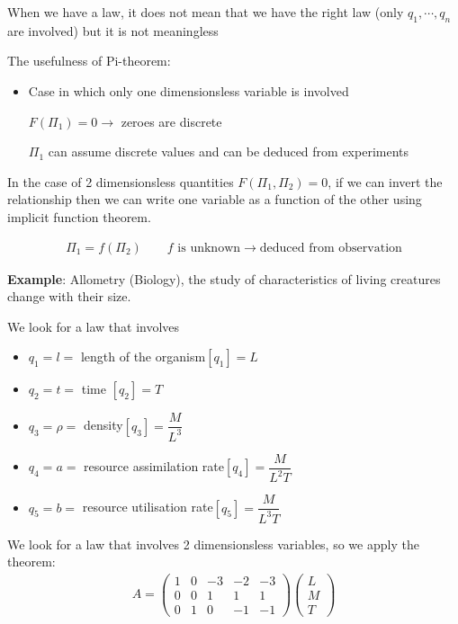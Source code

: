 \noindent When we have a law, it does not mean that we have the right law (only $q_1,\cdots,q_n$ are involved) but it is not meaningless
\par\bigskip
\noindent The usefulness of Pi-theorem:\par
\begin{itemize}
  \item Case in which only one dimensionsless variable is involved\par
    $F(\Pi_1) = 0\rightarrow$ zeroes are discrete\par
    $\Pi_1$ can assume discrete values and can be deduced from experiments
\end{itemize}
\par\bigskip
\noindent In the case of 2 dimensionsless quantities $F(\Pi_1,\Pi_2) = 0$, if we can invert the relationship then we can write one variable as a function of the other using implicit function theorem.
\par\bigskip
\begin{equation*}
  \begin{gathered}
    \Pi_1 = f(\Pi_2)\qquad\text{$f$ is unknown}\rightarrow\text{deduced from observation}
  \end{gathered}
\end{equation*}
\par\bigskip
\noindent\textbf{Example}: Allometry (Biology), the study of characteristics of living creatures change with their size. \par
\noindent We look for a law that involves\par
\begin{itemize}
  \item $q_1 = l = $ length of the organism\qquad $[q_1] = L$
  \item $q_2 = t = $ time \qquad $[q_2] = T$
  \item $q_3 = \rho = $ density\qquad $[q_3] = \dfrac{M}{L^3}$
  \item $q_4 = a = $ resource assimilation rate\qquad$[q_4] = \dfrac{M}{L^2T}$
  \item $q_5 = b = $ resource utilisation rate\qquad $[q_5] = \dfrac{M}{L^3T}$
\end{itemize}
\par\bigskip
\noindent We look for a law that involves 2 dimensionsless variables, so we apply the theorem:
\begin{equation*}
  \begin{gathered}
    A = \begin{pmatrix}1&0&-3&-2&-3\\0&0&1&1&1\\0&1&0&-1&-1\end{pmatrix}\begin{pmatrix}L\\M\\T\end{pmatrix}
  \end{gathered}
\end{equation*}\par
